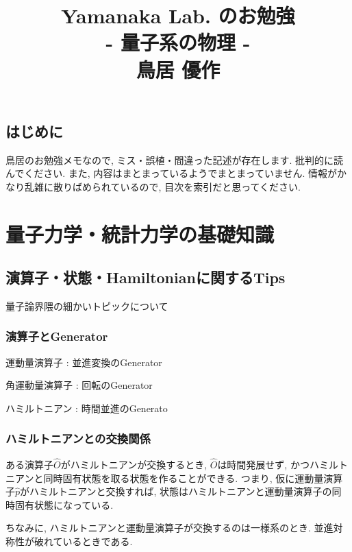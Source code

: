 \documentclass[10.5pt,a4paper]{jreport}
\title{
  \Huge Yamanaka Lab. のお勉強\\
  \huge - 量子系の物理 -\\[1cm]
  \Large 鳥居 優作
}
\begin{document}
\maketitle
\thispagestyle{empty}
\tableofcontents
\section{はじめに}
鳥居のお勉強メモなので, ミス・誤植・間違った記述が存在します. 批判的に読んでください. また, 内容はまとまっているようでまとまっていません. 情報がかなり乱雑に散りばめられているので, 目次を索引だと思ってください. 
\chapter{量子力学・統計力学の基礎知識}
\section{演算子・状態・Hamiltonianに関するTips}
量子論界隈の細かいトピックについて
\subsection{演算子とGenerator}
運動量演算子 : 並進変換のGenerator

角運動量演算子 : 回転のGenerator

ハミルトニアン : 時間並進のGenerato
\subsection{ハミルトニアンとの交換関係}
ある演算子$\hat{O}$がハミルトニアンが交換するとき, $\hat{O}$は時間発展せず, かつハミルトニアンと同時固有状態を取る状態を作ることができる. つまり, 仮に運動量演算子$\hat{p}$がハミルトニアンと交換すれば, 状態はハミルトニアンと運動量演算子の同時固有状態になっている.

ちなみに, ハミルトニアンと運動量演算子が交換するのは一様系のとき. 並進対称性が破れているときである. 
\end{document}
